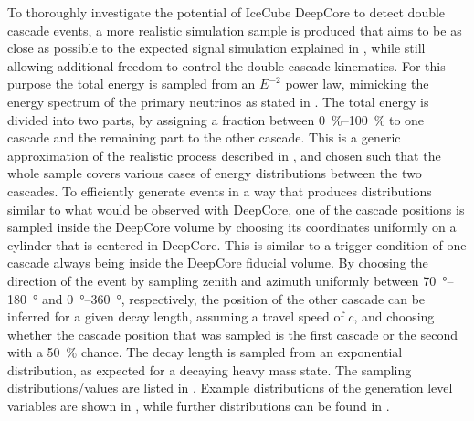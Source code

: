 To thoroughly investigate the potential of IceCube DeepCore to detect double cascade events, a more realistic simulation sample is produced that aims to be as close as possible to the expected signal simulation explained in , while still allowing additional freedom to control the double cascade kinematics. For this purpose the total energy is sampled from an $E^{-2}$ power law, mimicking the energy spectrum of the primary neutrinos as stated in .
The total energy is divided into two parts, by assigning a fraction between \SIrange[range-phrase={~and~}]{0}{100}{\percent} to one cascade and the remaining part to the other cascade. This is a generic approximation of the realistic process described in , and chosen such that the whole sample covers various cases of energy distributions between the two cascades. To efficiently generate events in a way that produces distributions similar to what would be observed with DeepCore, one of the cascade positions is sampled inside the DeepCore volume by choosing its coordinates uniformly on a cylinder that is centered in DeepCore. This is similar to a trigger condition of one cascade always being inside the DeepCore fiducial volume. By choosing the direction of the event by sampling zenith and azimuth uniformly between \SIrange[range-phrase={~and~}]{70}{180}{\degree} and \SIrange[range-phrase={~and~}]{0}{360}{\degree}, respectively, the position of the other cascade can be inferred for a given decay length, assuming a travel speed of $c$, and choosing whether the cascade position that was sampled is the first cascade or the second with a \SI{50}{\percent} chance. The decay length is sampled from an exponential distribution, as expected for a decaying heavy mass state.
The sampling distributions/values are listed in . Example distributions of the generation level variables are shown in , while further distributions can be found in .

